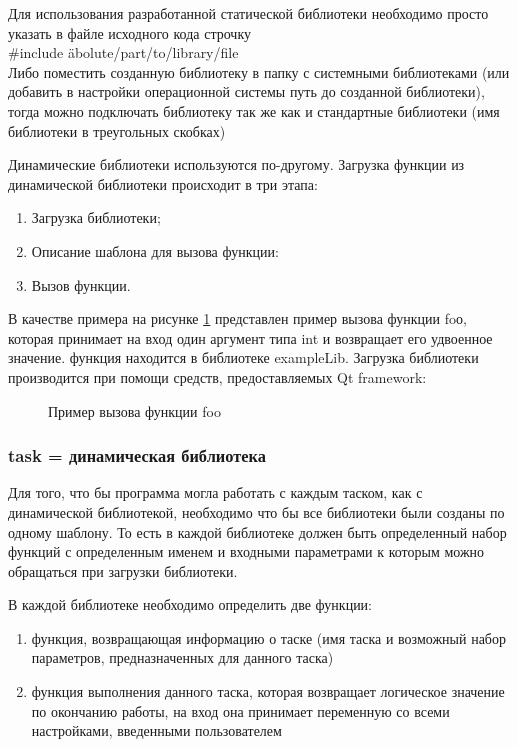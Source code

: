 Для использования разработанной статической библиотеки необходимо просто указать в файле исходного кода строчку \\
#include \"abolute/part/to/library/file\" \\
Либо поместить созданную библиотеку в папку с системными библиотеками (или добавить в настройки операционной системы путь до созданной библиотеки), тогда можно подключать библиотеку так же как и стандартные библиотеки (имя библиотеки в треугольных скобках)

Динамические библиотеки используются по-другому. Загрузка функции из динамической библиотеки происходит в три этапа: 

\begin{enumerate}
\item Загрузка библиотеки;
\item Описание шаблона для вызова функции:
\item Вызов функции.
\end{enumerate}

В качестве примера на рисунке \ref{ris:dinLib} представлен пример вызова функции foо, которая принимает на вход один аргумент типа int и возвращает его удвоенное значение. функция находится в библиотеке exampleLib. Загрузка библиотеки производится при помощи средств, предоставляемых Qt framework: 

\begin{figure}[ht] 
\caption{Пример вызова функции foo}
\label{ris:dinLib}
\end{figure}

\subsubsection{task = динамическая библиотека}

Для того, что бы программа могла работать с каждым таском, как с динамической библиотекой, необходимо что бы все библиотеки были созданы по одному шаблону. То есть в каждой библиотеке должен быть определенный набор функций с определенным именем и входными параметрами к которым можно обращаться при загрузки библиотеки. 

В каждой библиотеке необходимо определить две функции:

\begin{enumerate}
\item функция, возвращающая информацию о таске (имя таска и возможный набор параметров, предназначенных для данного таска)
\item функция выполнения данного таска, которая возвращает логическое значение по окончанию работы, на вход она принимает переменную со всеми настройками, введенными пользователем
\end{enumerate}

